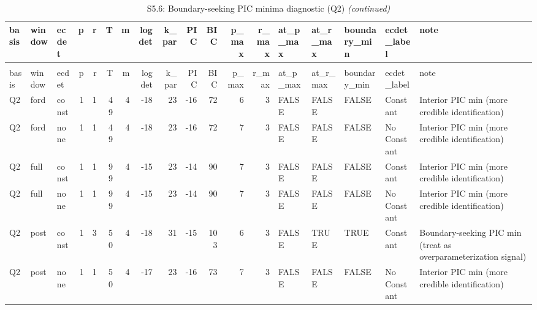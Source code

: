 \begingroup\fontsize{9}{11}\selectfont

\begin{longtable}[t]{lllrrrrrrrrrrlllll}
\caption{\label{tab:tab:S5_6_boundary_minima_Q2}S5.6: Boundary-seeking PIC minima diagnostic (Q2)}\\
\toprule
basis & window & ecdet & p & r & T & m & logdet & k\_par & PIC & BIC & p\_max & r\_max & at\_p\_max & at\_r\_max & boundary\_min & ecdet\_label & note\\
\midrule
\endfirsthead
\caption[]{S5.6: Boundary-seeking PIC minima diagnostic (Q2) \textit{(continued)}}\\
\toprule
basis & window & ecdet & p & r & T & m & logdet & k\_par & PIC & BIC & p\_max & r\_max & at\_p\_max & at\_r\_max & boundary\_min & ecdet\_label & note\\
\midrule
\endhead

\endfoot
\bottomrule
\endlastfoot
Q2 & ford & const & 1 & 1 & 49 & 4 & -18 & 23 & -16 & 72 & 6 & 3 & FALSE & FALSE & FALSE & Constant & Interior PIC min (more credible identification)\\
Q2 & ford & none & 1 & 1 & 49 & 4 & -18 & 23 & -16 & 72 & 7 & 3 & FALSE & FALSE & FALSE & No Constant & Interior PIC min (more credible identification)\\
Q2 & full & const & 1 & 1 & 99 & 4 & -15 & 23 & -14 & 90 & 7 & 3 & FALSE & FALSE & FALSE & Constant & Interior PIC min (more credible identification)\\
Q2 & full & none & 1 & 1 & 99 & 4 & -15 & 23 & -14 & 90 & 7 & 3 & FALSE & FALSE & FALSE & No Constant & Interior PIC min (more credible identification)\\
Q2 & post & const & 1 & 3 & 50 & 4 & -18 & 31 & -15 & 103 & 6 & 3 & FALSE & TRUE & TRUE & Constant & Boundary-seeking PIC min (treat as overparameterization signal)\\
\addlinespace
Q2 & post & none & 1 & 1 & 50 & 4 & -17 & 23 & -16 & 73 & 7 & 3 & FALSE & FALSE & FALSE & No Constant & Interior PIC min (more credible identification)\\*
\end{longtable}
\endgroup{}
